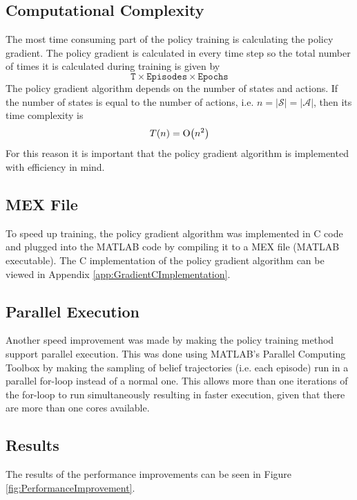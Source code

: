 \subsection{Computational Complexity}
The most time consuming part of the policy training is calculating the policy gradient. The policy gradient is calculated in every time step so the total number of times it is calculated during training is given by
\begin{equation}
  \texttt{T} \times \texttt{Episodes} \times \texttt{Epochs}
\end{equation}
The policy gradient algorithm depends on the number of states and actions. If the number of states is equal to the number of actions, i.e. $n = |\mathcal{S}| = |\mathcal{A}|$, then its time complexity is
\begin{equation}
  T(n) = \operatorname{O}\bigl(n^2\bigr)
\end{equation}
For this reason it is important that the policy gradient algorithm is implemented with efficiency in mind.

\subsection{MEX File}
To speed up training, the policy gradient algorithm was implemented in C code and plugged into the MATLAB code by compiling it to a MEX file (MATLAB executable). The C implementation of the policy gradient algorithm can be viewed in Appendix \ref{app:GradientCImplementation}.

\subsection{Parallel Execution}
Another speed improvement was made by making the policy training method support parallel execution. This was done using MATLAB's Parallel Computing Toolbox\texttrademark{} by making the sampling of belief trajectories (i.e. each episode) run in a parallel for-loop instead of a normal one. This allows more than one iterations of the for-loop to run simultaneously resulting in faster execution, given that there are more than one cores available.

\subsection{Results}
The results of the performance improvements can be seen in Figure \ref{fig:PerformanceImprovement}.

